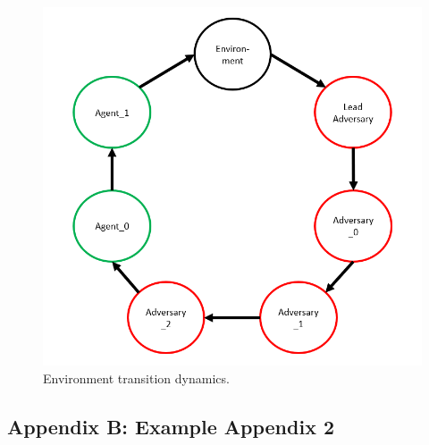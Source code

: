 \documentclass{article}
\begin{document}
\begin{figure}[!ht]
  \centering
  \includegraphics[scale=0.5]{Cycle_diagram.png}
  \caption{Environment transition dynamics.}
  \label{fig:stepcycle}
\end{figure}



\subsection*{Appendix B: Example Appendix 2}
\end{document}
